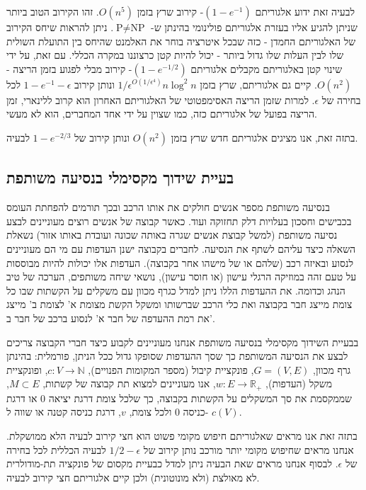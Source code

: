 \begin{hebrew}
לבעיה זאת ידוע אלגוריתם
$(1-e^{-1})$-%
קירוב שרץ בזמן
$O(n^5)$.
זהו הקירוב הטוב ביותר שניתן להגיע אליו בעזרת אלגוריתם פולינומי בהינתן ש-%
$\text{P} \neq \text{NP}$.
ניתן להראות שיחס הקירוב של האלגוריתם החמדן - כזה שבכל איטרציה בוחר את האלמנט שהיחס בין התועלת השולית שלו לבין העלות שלו גדול ביותר - יכול להיות קטן כרצוננו במקרה הכללי.
עם זאת, על ידי שינוי קטן באלגוריתם מקבלים אלגוריתם
$(1 - e^{-1/2})$-%
קירוב מבלי לפגוע בזמן הריצה -
$O(n^2)$.
קיים גם אלגוריתם, שרץ בזמן
$1/\epsilon^{O(1/\epsilon^4)}n\log^2n$
ונותן קירוב
$1 - e^{-1} -\epsilon$
לכל בחירה של
$\epsilon$.
למרות שזמן הריצה האסימפטוטי של האלגוריתם האחרון הוא קרוב ללינארי, זמן הריצה בפועל של אלגוריתם כזה, כמו שצוין על ידי אחד המחברים, הוא לא מעשי.

בתזה זאת, אנו מציגים אלגוריתם חדש שרץ בזמן
$O(n^2)$
ונותן קירוב של
$1 - e^{-2/3}$
לבעיה.




\subsection*{\texthebrew{בעיית שידוך מקסימלי בנסיעה משותפת}}

בנסיעה משותפת מספר אנשים חולקים את אותו הרכב ובכך תורמים להפחתת העומס בכבישים וחסכון בעלויות דלק תחזוקה ועוד.
כאשר קבוצה של אנשים רוצים מעוניינים לבצע נסיעה משותפת (למשל קבוצת אנשים שגרה באותה שכונה ועובדת באותו אזור) נשאלת השאלה כיצד עליהם לשתף את הנסיעה.
לחברים בקבוצה ישנן העדפות עם מי הם מעוניינים לנסוע ובאיזה רכב (שלהם או של מישהו אחר בקבוצה).
העדפות אלו יכולות להיות מבוססות על טעם זהה במוזיקה הרגלי עישון (או חוסר עישון), נושאי שיחה משותפים, הערכה של טיב הנהג וכדומה.
את ההעדפות הללו ניתן למדל כגרף מכוון עם משקלים על הקשתות שבו כל צומת מייצג חבר בקבוצה ואת כלי הרכב שברשותו ומשקל הקשת מצומת א' לצומת ב' מייצג את רמת ההעדפה של חבר א' לנסוע ברכב של חבר ב'.

בבעיית השידוך מקסימלי בנסיעה משותפת אנחנו מעוניינים לקבוע כיצד חברי הקבוצה צריכים לבצע את הנסיעה המשותפת כך שסך ההעדפות שסופקו גדול ככל הניתן, פורמלית:
בהינתן גרף מכוון,
$G = (V, E)$,
פונקציית קיבול (מספר המקומות הפנויים),
$c:V \to \mathbb{N}$,
ופונקציית משקל (העדפות),
$w:E \to \mathbb{R}_+$,
אנו מעוניינים למצוא תת קבוצה של קשתות,
$M \subset E$,
שממקסמת את סך המשקלים על הקשתות בקבוצה, כך שלכל צומת דרגת יציאה 0 או דרגת כניסה 0 ולכל צומת,
$v$,
דרגת כניסה קטנה או שווה ל-%
$c(V)$.

בתזה זאת אנו מראים שאלגוריתם חיפוש מקומי פשוט הוא חצי קירוב לבעיה הלא ממושקלת.
אנחנו מראים שחיפוש מקומי יותר מורכב נותן קירוב של
$1/2 - \epsilon$
לבעיה הכללית לכל בחירה של
$\epsilon$.
לבסוף אנחנו מראים שאת הבעיה ניתן למדל כבעיית מקסום של פונקציה תת-מודולרית לא מאולצת (ולא מונוטונית) ולכן קיים אלגוריתם חצי קירוב לבעיה.




\end{hebrew}
